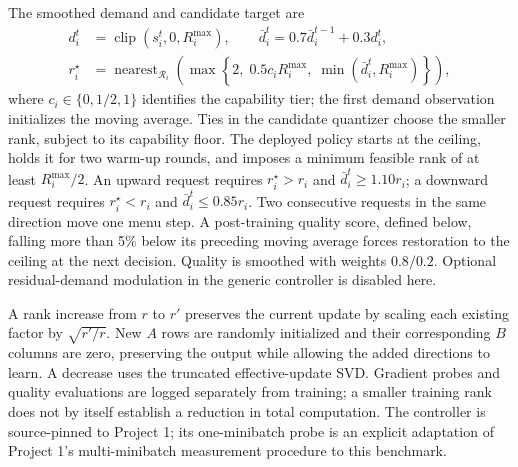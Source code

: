 \documentclass[11pt]{article}
\newcommand{\clip}{\operatorname{clip}}
\begin{document}
The smoothed demand and candidate target are
\begin{align}
 d_i^t&=\clip(s_i^t,0,R_i^{\max}),\qquad
 \bar d_i^t=0.7\bar d_i^{t-1}+0.3d_i^t,\\
 r_i^\star&=\operatorname{nearest}_{\mathcal R_i}
 \left(\max\left\{2,\;0.5c_iR_i^{\max},\;\min(\bar d_i^t,R_i^{\max})\right\}\right),
 \label{eq:rank-target}
\end{align}
where $c_i\in\{0,1/2,1\}$ identifies the capability tier; the first demand observation initializes the moving average. Ties in the candidate quantizer choose the smaller rank, subject to its capability floor. The deployed policy starts at the ceiling, holds it for two warm-up rounds, and imposes a minimum feasible rank of at least $R_i^{\max}/2$. An upward request requires $r_i^\star>r_i$ and $\bar d_i^t\ge1.10r_i$; a downward request requires $r_i^\star<r_i$ and $\bar d_i^t\le0.85r_i$. Two consecutive requests in the same direction move one menu step. A post-training quality score, defined below, falling more than 5\% below its preceding moving average forces restoration to the ceiling at the next decision. Quality is smoothed with weights $0.8/0.2$. Optional residual-demand modulation in the generic controller is disabled here.

A rank increase from $r$ to $r'$ preserves the current update by scaling each existing factor by $\sqrt{r'/r}$. New $A$ rows are randomly initialized and their corresponding $B$ columns are zero, preserving the output while allowing the added directions to learn. A decrease uses the truncated effective-update SVD. Gradient probes and quality evaluations are logged separately from training; a smaller training rank does not by itself establish a reduction in total computation. The controller is source-pinned to Project 1; its one-minibatch probe is an explicit adaptation of Project 1's multi-minibatch measurement procedure to this benchmark.
\end{document}
